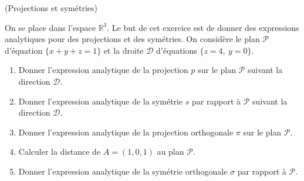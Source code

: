\documentclass[a4paper,12pt,reqno]{amsart}
\begin{document}
\begin{exo} (Projections et symétries)

  On se place dans l'espace $\mathbb{R}^{3}$. Le but de cet exercice est de donner des expressions analytiques pour des projections et des symétries. On considère le plan $\mathcal{P}$ d'équation $\{x+y+z=1\}$ et la droite $\mathcal{D}$ d'équations $\{z=4,\ y=0\}$.

  \begin{enumerate}

    \item Donner l'expression analytique de la projection $p$ sur le plan $\mathcal{P}$ suivant la direction $\mathcal{D}$.

    \item Donner l'expression analytique de la symétrie $s$ par rapport à $\mathcal{P}$ suivant la direction $\mathcal{D}$.

    \item Donner l'expression analytique de la projection orthogonale $\pi$ sur le plan $\mathcal{P}$.

    \item Calculer la distance de $A=(1,0,1)$ au plan $\mathcal{P}$.

    \item Donner l'expression analytique de la symétrie orthogonale $\sigma$ par rapport à $\mathcal{P}$.

  \end{enumerate}
\end{exo}
\end{document}
